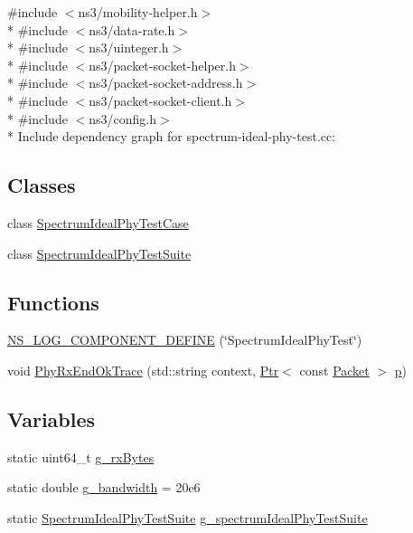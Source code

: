 {\ttfamily \#include $<$ns3/mobility-\/helper.\+h$>$}\\*
{\ttfamily \#include $<$ns3/data-\/rate.\+h$>$}\\*
{\ttfamily \#include $<$ns3/uinteger.\+h$>$}\\*
{\ttfamily \#include $<$ns3/packet-\/socket-\/helper.\+h$>$}\\*
{\ttfamily \#include $<$ns3/packet-\/socket-\/address.\+h$>$}\\*
{\ttfamily \#include $<$ns3/packet-\/socket-\/client.\+h$>$}\\*
{\ttfamily \#include $<$ns3/config.\+h$>$}\\*
Include dependency graph for spectrum-\/ideal-\/phy-\/test.cc\+:
\subsection*{Classes}
\begin{DoxyCompactItemize}
\item 
class \hyperlink{classSpectrumIdealPhyTestCase}{Spectrum\+Ideal\+Phy\+Test\+Case}
\item 
class \hyperlink{classSpectrumIdealPhyTestSuite}{Spectrum\+Ideal\+Phy\+Test\+Suite}
\end{DoxyCompactItemize}
\subsection*{Functions}
\begin{DoxyCompactItemize}
\item 
\hyperlink{spectrum-ideal-phy-test_8cc_a72de515accca41b89b4a40bf7380c1b9}{N\+S\+\_\+\+L\+O\+G\+\_\+\+C\+O\+M\+P\+O\+N\+E\+N\+T\+\_\+\+D\+E\+F\+I\+NE} (\char`\"{}Spectrum\+Ideal\+Phy\+Test\char`\"{})
\item 
void \hyperlink{spectrum-ideal-phy-test_8cc_abe11a97645f01a1213944fb2cbabeb1a}{Phy\+Rx\+End\+Ok\+Trace} (std\+::string context, \hyperlink{classns3_1_1Ptr}{Ptr}$<$ const \hyperlink{classns3_1_1Packet}{Packet} $>$ \hyperlink{lte__link__budget__x2__handover__measures_8m_ac9de518908a968428863f829398a4e62}{p})
\end{DoxyCompactItemize}
\subsection*{Variables}
\begin{DoxyCompactItemize}
\item 
static uint64\+\_\+t \hyperlink{spectrum-ideal-phy-test_8cc_af09b60ca0cfec21bd5d0aff8f44eb19c}{g\+\_\+rx\+Bytes}
\item 
static double \hyperlink{spectrum-ideal-phy-test_8cc_afbfecc6762036c7df663ddb65ccae7a9}{g\+\_\+bandwidth} = 20e6
\item 
static \hyperlink{classSpectrumIdealPhyTestSuite}{Spectrum\+Ideal\+Phy\+Test\+Suite} \hyperlink{spectrum-ideal-phy-test_8cc_aeeb24e02b38f5a1c4456caddb3a44cef}{g\+\_\+spectrum\+Ideal\+Phy\+Test\+Suite}
\end{DoxyCompactItemize}


